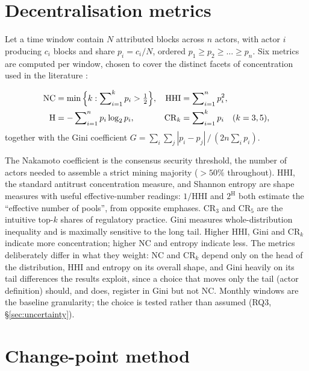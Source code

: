 \documentclass[logo,msc]{infthesis}           %
\begin{document}
\section{Decentralisation metrics}
\label{sec:metrics}
 
Let a time window contain $N$ attributed blocks across $n$ actors, with actor
$i$ producing $c_i$ blocks and share $p_i = c_i/N$, ordered $p_1 \ge p_2 \ge
\dots \ge p_n$. Six metrics are computed per window, chosen to cover the
distinct facets of concentration used in the literature
\cite{srinivasan2017quantifying,gencer2018decentralization}:
 
\begin{align}
  \mathrm{NC} &= \min\Big\{k : \sum\nolimits_{i=1}^{k} p_i > \tfrac{1}{2}\Big\},
  &
  \mathrm{HHI} &= \sum\nolimits_{i=1}^{n} p_i^2,
  \notag\\
  \mathrm{H} &= -\sum\nolimits_{i=1}^{n} p_i \log_2 p_i,
  &
  \mathrm{CR}_k &= \sum\nolimits_{i=1}^{k} p_i \quad (k = 3, 5),
  \label{eq:metricdefs}
\end{align}
together with the Gini coefficient
$G = \sum_{i}\sum_{j} |p_i - p_j| \,/\, (2n \sum_i p_i)$.
 
The Nakamoto coefficient \cite{srinivasan2017quantifying} is the consensus
security threshold, the number of actors needed to assemble a strict mining
majority ($>50\%$ throughout). HHI, the standard antitrust concentration
measure, and Shannon entropy are shape measures with useful effective-number
readings: $1/\mathrm{HHI}$ and $2^{\mathrm{H}}$ both estimate the ``effective
number of pools'', from opposite emphases. $\mathrm{CR}_3$ and $\mathrm{CR}_5$
are the intuitive top-$k$ shares of regulatory practice. Gini measures
whole-distribution inequality and is maximally sensitive to the long tail.
Higher HHI, Gini and $\mathrm{CR}_k$ indicate more concentration; higher NC
and entropy indicate less. The metrics deliberately differ in what they
weight: NC and $\mathrm{CR}_k$ depend only on the head of the distribution,
HHI and entropy on its overall shape, and Gini heavily on its tail
differences the results exploit, since a choice that moves only the tail
(actor definition) should, and does, register in Gini but not NC. Monthly
windows are the baseline granularity; the choice is tested rather than
assumed (RQ3, \S\ref{sec:uncertainty}).
 
\section{Change-point method}
\label{sec:changepoint}
 
\end{document}

